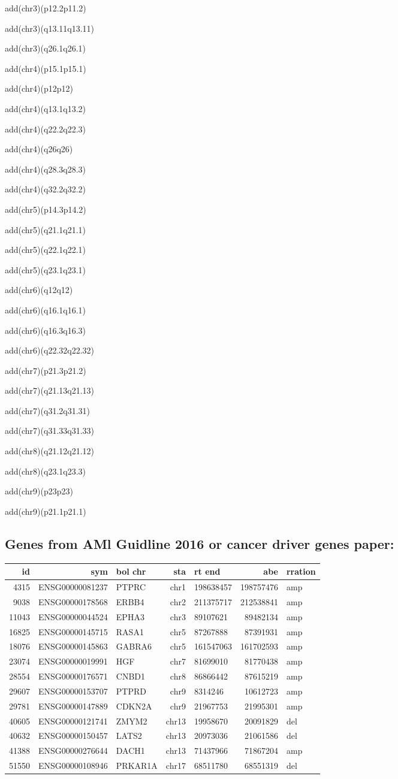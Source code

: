 \documentclass[]{article}
\begin{document}
add(chr3)(p12.2p11.2)

add(chr3)(q13.11q13.11)

add(chr3)(q26.1q26.1)

add(chr4)(p15.1p15.1)

add(chr4)(p12p12)

add(chr4)(q13.1q13.2)

add(chr4)(q22.2q22.3)

add(chr4)(q26q26)

add(chr4)(q28.3q28.3)

add(chr4)(q32.2q32.2)

add(chr5)(p14.3p14.2)

add(chr5)(q21.1q21.1)

add(chr5)(q22.1q22.1)

add(chr5)(q23.1q23.1)

add(chr6)(q12q12)

add(chr6)(q16.1q16.1)

add(chr6)(q16.3q16.3)

add(chr6)(q22.32q22.32)

add(chr7)(p21.3p21.2)

add(chr7)(q21.13q21.13)

add(chr7)(q31.2q31.31)

add(chr7)(q31.33q31.33)

add(chr8)(q21.12q21.12)

add(chr8)(q23.1q23.3)

add(chr9)(p23p23)

add(chr9)(p21.1p21.1)

\hypertarget{genes-from-aml-guidline-2016-or-cancer-driver-genes-paper}{%
\subsection{Genes from AMl Guidline 2016 or cancer driver genes
paper:}\label{genes-from-aml-guidline-2016-or-cancer-driver-genes-paper}}

\begin{longtable}[]{@{}rrlrlrl@{}}
\toprule
id & sym & bol chr & sta & rt end & abe & rration\tabularnewline
\midrule
\endhead
4315 & ENSG00000081237 & PTPRC & chr1 & 198638457 & 198757476 &
amp\tabularnewline
9038 & ENSG00000178568 & ERBB4 & chr2 & 211375717 & 212538841 &
amp\tabularnewline
11043 & ENSG00000044524 & EPHA3 & chr3 & 89107621 & 89482134 &
amp\tabularnewline
16825 & ENSG00000145715 & RASA1 & chr5 & 87267888 & 87391931 &
amp\tabularnewline
18076 & ENSG00000145863 & GABRA6 & chr5 & 161547063 & 161702593 &
amp\tabularnewline
23074 & ENSG00000019991 & HGF & chr7 & 81699010 & 81770438 &
amp\tabularnewline
28554 & ENSG00000176571 & CNBD1 & chr8 & 86866442 & 87615219 &
amp\tabularnewline
29607 & ENSG00000153707 & PTPRD & chr9 & 8314246 & 10612723 &
amp\tabularnewline
29781 & ENSG00000147889 & CDKN2A & chr9 & 21967753 & 21995301 &
amp\tabularnewline
40605 & ENSG00000121741 & ZMYM2 & chr13 & 19958670 & 20091829 &
del\tabularnewline
40632 & ENSG00000150457 & LATS2 & chr13 & 20973036 & 21061586 &
del\tabularnewline
41388 & ENSG00000276644 & DACH1 & chr13 & 71437966 & 71867204 &
amp\tabularnewline
51550 & ENSG00000108946 & PRKAR1A & chr17 & 68511780 & 68551319 &
del\tabularnewline
\bottomrule
\end{longtable}
\end{document}
